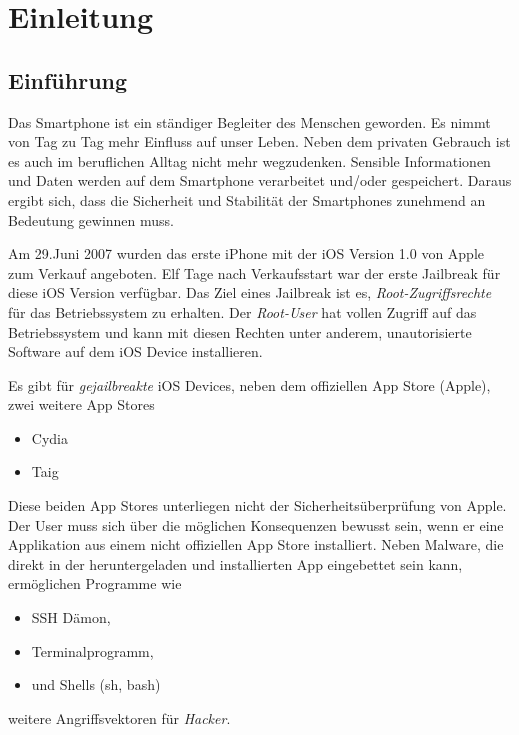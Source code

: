 %
%
%
% 


\chapter{Einleitung}
\label{ch:intro}


\section{Einführung}
\label{sec:Einführung}

Das Smartphone ist ein ständiger Begleiter des Menschen geworden. Es nimmt von Tag zu Tag mehr Einfluss auf unser Leben. Neben dem privaten Gebrauch ist es auch im beruflichen Alltag nicht mehr wegzudenken. Sensible Informationen und Daten werden auf dem Smartphone verarbeitet und/oder gespeichert. Daraus ergibt sich, dass die Sicherheit und Stabilität der Smartphones zunehmend an Bedeutung gewinnen muss.\par 
Am 29.Juni 2007 wurden das erste iPhone mit der iOS Version 1.0 von Apple zum Verkauf angeboten. Elf Tage nach Verkaufsstart war der erste Jailbreak für diese iOS Version verfügbar. Das Ziel eines Jailbreak ist es, \textit{\glqq Root-Zugriffsrechte\grqq{}} für das Betriebssystem zu erhalten. Der \textit{\glqq Root-User\grqq{}} hat vollen Zugriff auf das Betriebssystem und kann mit diesen Rechten unter anderem, unautorisierte Software auf dem iOS Device installieren.\par 

Es gibt für \textit{\glqq gejailbreakte\grqq{}} iOS Devices, neben dem offiziellen App Store (Apple), zwei weitere App Stores
\begin{itemize}
    \item Cydia
    \item Taig
\end{itemize}
Diese beiden App Stores unterliegen nicht der Sicherheitsüberprüfung von Apple. Der User muss sich über die möglichen Konsequenzen bewusst sein, wenn er eine Applikation aus einem nicht offiziellen App Store installiert. Neben Malware, die direkt in der heruntergeladen und installierten App eingebettet sein kann, ermöglichen Programme wie 
\begin{itemize}
    \item SSH Dämon,
    \item Terminalprogramm,
    \item und Shells (sh, bash)
\end{itemize}
weitere Angriffsvektoren für \textit{\glqq Hacker\grqq{}}.

